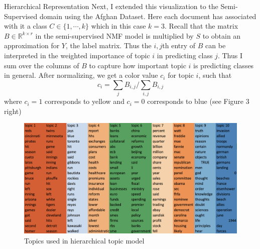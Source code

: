 \documentclass[12pt]{pom_thesis}
\begin{document}
\begin{chapter}{Hierarchical Representation}
Next, I extended this visualization to the Semi-Supervised domain using the Afghan Dataset. Here each document has associated with it a class $C\in \{1,\cdots,k\}$ which in this case $k=3$. Recall that the matrix $B \in \mathbb{R}^{k \times r}$ in the semi-supervised NMF model is multiplied by $S$ to obtain an approximation for $Y$, the label matrix. Thus the $i,j$th entry of $B$ can be interpreted in the weighted importance of topic $i$ in predicting class $j$. Thus I sum over the columns of $B$ to capture how important topic $i$ is predicting classes in general. After normalizing, we get a color value $c_i$ for topic $i$, such that
$$c_i = \sum_j B_{i,j} /  \sum_{i,j} B_{i,j}$$
where $c_i=1$ corresponds to yellow and $c_i=0$ corresponds to blue (see Figure 3 right)
\begin{figure}
	\centering
	\includegraphics[width=7in]{topic}
	\caption{Topics used in hierarchical topic model}
\end{figure}
\end{chapter}
\end{document}
